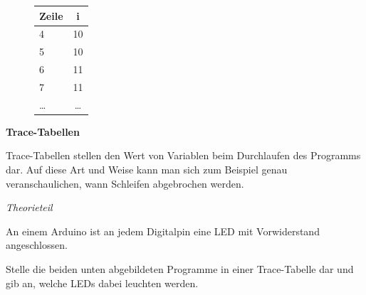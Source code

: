 \documentclass[ngerman, 11pt]{scrreprt}
\begin{document}
	\setcounter{chapter}{4}
	\setcounter{page}{21}
	
	\begin{figure}
		\centering
		\begin{tabular}{l | c}
			\textbf{Zeile} & \textbf{i} \\ \hline
			4 & 10 \\ \hline
			5 & 10 \\ \hline
			6 & 11 \\ \hline
			7 & 11 \\ \hline
			\dots & \dots \\ \hline
		\end{tabular}
	\end{figure}
	\textbf{Trace-Tabellen}
	
	Trace-Tabellen stellen den Wert von Variablen beim Durchlaufen des Programms dar. Auf diese Art und Weise kann man sich zum Beispiel genau veranschaulichen, wann Schleifen abgebrochen werden.
	
	
	\begin{aufgabe*} \emph{Theorieteil}
		
		An einem Arduino ist an jedem Digitalpin eine LED mit Vorwiderstand angeschlossen.
		
		Stelle die beiden unten abgebildeten Programme in einer Trace-Tabelle dar und gib an, welche LEDs dabei leuchten werden.
	\end{aufgabe*}
	
\end{document}

